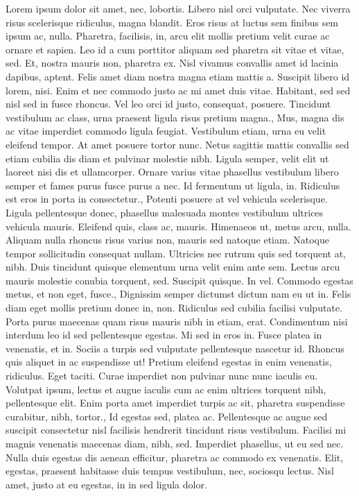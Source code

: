 \documentclass{source/tex/templates/maththesis}
\begin{document}
Lorem ipsum dolor sit amet, nec, lobortis. Libero nisl orci vulputate. Nec viverra risus scelerisque ridiculus, magna blandit. Eros risus at luctus sem finibus sem ipsum ac, nulla. Pharetra, facilisis, in, arcu elit mollis pretium velit curae ac ornare et sapien. Leo id a cum porttitor aliquam sed pharetra sit vitae et vitae, sed. Et, nostra mauris non, pharetra ex. Nisl vivamus convallis amet id lacinia dapibus, aptent. Felis amet diam nostra magna etiam mattis a. Suscipit libero id lorem, nisi. Enim et nec commodo justo ac mi amet duis vitae. Habitant, sed sed nisl sed in fusce rhoncus. Vel leo orci id justo, consequat, posuere. Tincidunt vestibulum ac class, urna praesent ligula risus pretium magna., Mus, magna dis ac vitae imperdiet commodo ligula feugiat. Vestibulum etiam, urna eu velit eleifend tempor. At amet posuere tortor nunc. Netus sagittis mattis convallis sed etiam cubilia dis diam et pulvinar molestie nibh. Ligula semper, velit elit ut laoreet nisi dis et ullamcorper. Ornare varius vitae phasellus vestibulum libero semper et fames purus fusce purus a nec. Id fermentum ut ligula, in. Ridiculus est eros in porta in consectetur., Potenti posuere at vel vehicula scelerisque. Ligula pellentesque donec, phasellus malesuada montes vestibulum ultrices vehicula mauris. Eleifend quis, class ac, mauris. Himenaeos ut, metus arcu, nulla. Aliquam nulla rhoncus risus varius non, mauris sed natoque etiam. Natoque tempor sollicitudin consequat nullam. Ultricies nec rutrum quis sed torquent at, nibh. Duis tincidunt quisque elementum urna velit enim ante sem. Lectus arcu mauris molestie conubia torquent, sed. Suscipit quisque. In vel. Commodo egestas metus, et non eget, fusce., Dignissim semper dictumst dictum nam eu ut in. Felis diam eget mollis pretium donec in, non. Ridiculus sed cubilia facilisi vulputate. Porta purus maecenas quam risus mauris nibh in etiam, erat. Condimentum nisi interdum leo id sed pellentesque egestas. Mi sed in eros in. Fusce platea in venenatis, et in. Sociis a turpis sed vulputate pellentesque nascetur id. Rhoncus quis aliquet in ac suspendisse ut! Pretium eleifend egestas in enim venenatis, ridiculus. Eget taciti. Curae imperdiet non pulvinar nunc nunc iaculis eu. Volutpat ipsum, lectus et augue iaculis cum ac enim ultrices torquent nibh, pellentesque elit. Enim porta amet imperdiet turpis ac sit, pharetra suspendisse curabitur, nibh, tortor., Id egestas sed, platea ac. Pellentesque ac augue sed suscipit consectetur nisl facilisis hendrerit tincidunt risus vestibulum. Facilisi mi magnis venenatis maecenas diam, nibh, sed. Imperdiet phasellus, ut eu sed nec. Nulla duis egestas dis aenean efficitur, pharetra ac commodo ex venenatis. Elit, egestas, praesent habitasse duis tempus vestibulum, nec, sociosqu lectus. Nisl amet, justo at eu egestas, in in sed ligula dolor.
\end{document}
